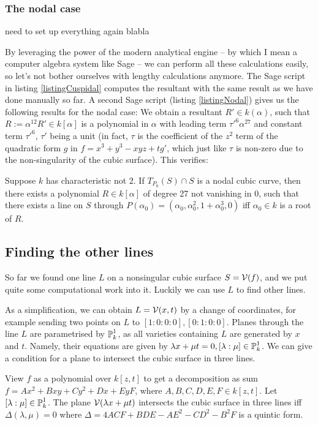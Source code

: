 \subsubsection{The nodal case}
\begin{todo}
\item need to set up everything again blabla
\end{todo}
By leveraging the power of the modern analytical engine -- by which I mean a computer algebra system like Sage \cite{sagemath2014} -- we can perform all these calculations easily, so let's not bother ourselves with lengthy calculations anymore.
The Sage script in listing \ref{listingCuspidal} computes the resultant with the same result as we have done manually so far.
A second Sage script (listing \ref{listingNodal}) gives us the following results for the nodal case:
We obtain a resultant $R' \in k(\alpha)$, such that $R := \alpha^{12}R' \in k[\alpha]$ is a polynomial in $\alpha$ with leading term $\tau'^6\alpha^{27}$ and constant term $\tau'^6$, $\tau'$ being a unit (in fact, $\tau$ is the coefficient of the $z^2$ term of the quadratic form $g$ in $f = x^3 + y^3 - xyz + tg'$, which just like $\tau$ is non-zero due to the non-singularity of the cubic surface).
This verifies:
\begin{proposition}
Suppose $k$ has characteristic not 2.
If $T_{P_0}(S) \cap S$ is a nodal cubic curve, then there exists a polynomial $R \in k[\alpha]$ of degree 27 not vanishing in 0, such that there exists a line on $S$ through $P(\alpha_0) = (\alpha_0,\alpha_0^2,1+\alpha_0^3,0)$ iff $\alpha_0 \in k$ is a root of $R$.
\end{proposition}

\subsection{Finding the other lines}

So far we found one line $L$ on a nonsingular cubic surface $S = \operatorname{\mathcal V}(f)$, and we put quite some computational work into it.
Luckily we can use $L$ to find other lines.

As a simplification, we can obtain $L=\operatorname{\mathcal V}(x,t)$ by a change of coordinates, for example sending two points on $L$ to $[1:0:0:0],[0:1:0:0]$.
Planes through the line $L$ are parametrised by $\operatorname{\mathbb P}^1_k$, as all varieties containing $L$ are generated by $x$ and $t$.
Namely, their equations are given by $\lambda x + \mu t = 0, [\lambda:\mu] \in \operatorname{\mathbb P}^1_k$.
We can give a condition for a plane to intersect the cubic surface in three lines.
\begin{lemma}
View $f$ as a polynomial over $k[z,t]$ to get a decomposition as sum $f = Ax^2 + Bxy + Cy^2 + Dx + Ey F$, where $A,B,C,D,E,F \in k[z,t]$.
Let $[\lambda:\mu] \in \operatorname{\mathbb P}^1_k$.
The plane $\operatorname{\mathcal V}(\lambda x + \mu t)$ intersects the cubic surface in three lines iff
$\Delta(\lambda,\mu) = 0$ where $\Delta = 4ACF + BDE - AE^2 - CD^2 - B^2F$ is a quintic form.
\end{lemma}

